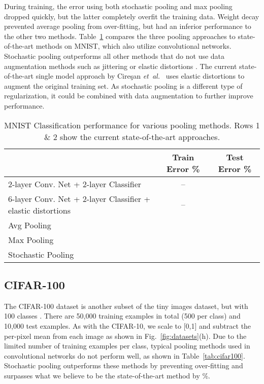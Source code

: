 \documentclass{article} \usepackage{nips12submit_e,times}
\newcommand{\fig}[1]{Fig.~\ref{fig:#1}}
\newcommand{\tab}[1]{Table~\ref{tab:#1}}
\def\etal{{\textit{et~al.~}}}
\begin{document}
During training, the error using both stochastic pooling and max
pooling dropped quickly, but the latter completely overfit the
training data. Weight decay prevented average pooling from
over-fitting, but had an inferior performance to the other two
methods. \tab{mnist} compares the three pooling approaches to
state-of-the-art methods on MNIST, which also utilize convolutional
networks. Stochastic pooling outperforms all other methods that do not use
data augmentation methods such as jittering or elastic distortions \cite{mnistresults}.
The current state-of-the-art single model approach by Cireşan \etal
\cite{Ciresan11} uses elastic distortions to augment the
original training set. As stochastic pooling is a different type of
regularization, it could be combined with data augmentation to further
improve performance.





\begin{table}[h!]
\small
\vspace*{-2mm}
\begin{center}
\begin{tabular}{|l|c|c|}
  \hline
  & Train Error \% & Test Error \% \\
  \hline 2-layer Conv. Net + 2-layer Classifier  \cite{Jarrett2009} & -- &  \\
  \hline 6-layer Conv. Net + 2-layer Classifier + elastic distortions \cite{Ciresan11} & -- &  \\
  \hline  \hline   Avg Pooling &  &  \\
  \hline Max Pooling &  &  \\
  \hline Stochastic Pooling &  &  \\
  \hline
\end{tabular}
\vspace*{-2mm}
\caption{MNIST Classification performance for various pooling
  methods. Rows 1 \& 2 show the current state-of-the-art
  approaches.}
\label{tab:mnist}
\end{center}
\vspace*{-5mm}
\end{table}


\subsection{CIFAR-100}

The CIFAR-100 dataset is another subset of the tiny images dataset,
but with 100 classes \cite{Kriz09}. There are 50,000 training examples in total (500
per class) and 10,000 test examples. As with the CIFAR-10, we scale to [0,1] and subtract
the per-pixel mean from each image as shown in \fig{datasets}(h). Due
to the limited number of training examples per class, typical pooling
methods used in convolutional networks do not perform well, as shown in
\tab{cifar100}. Stochastic pooling outperforms these methods by
preventing over-fitting and surpasses what we believe to be the state-of-the-art
method by \%.
\end{document}

